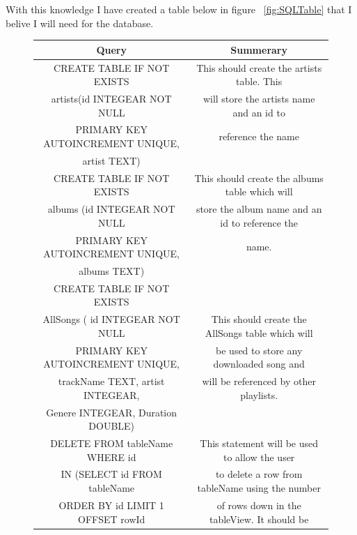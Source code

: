 \documentclass{article}
\begin{document}
With this knowledge I have created a table below in figure ~\ref{fig:SQLTable}
that I belive I will need for the database.


\begin{figure}[H]
    \begin{center}
        \begin{tabular} { | c | c | }
            \hline
            \textbf{Query}                   &                 \textbf{Summerary}             \\ \hline
            CREATE TABLE IF NOT EXISTS       &This should create the artists table. This      \\
            artists(id INTEGEAR NOT NULL     &will store the artists name and an id to        \\
            PRIMARY KEY AUTOINCREMENT UNIQUE,&reference the name                              \\
            artist TEXT)                     &                                                \\ \hline
            CREATE TABLE IF NOT EXISTS       &This should create the albums table which will  \\
            albums (id INTEGEAR NOT NULL     &store the album name and an id to reference the \\
            PRIMARY KEY AUTOINCREMENT UNIQUE,&name.                                           \\
            albums TEXT)                     &                                                \\ \hline
            CREATE TABLE IF NOT EXISTS       &                                                \\
            AllSongs ( id INTEGEAR NOT NULL  &This should create the AllSongs table which will\\
            PRIMARY KEY AUTOINCREMENT UNIQUE,&be used to store any downloaded song and        \\
            trackName TEXT, artist INTEGEAR, &will be referenced by other playlists.          \\
            Genere INTEGEAR, Duration DOUBLE)&                                                \\ \hline
            DELETE FROM tableName WHERE id   &This statement will be used to allow the user   \\
            IN (SELECT id FROM tableName     &to delete a row from tableName using the number \\
            ORDER BY id LIMIT 1 OFFSET rowId &of rows down in the tableView. It should be     \\

\end{tabular}
\end{center}
\end{figure}
\end{document}
